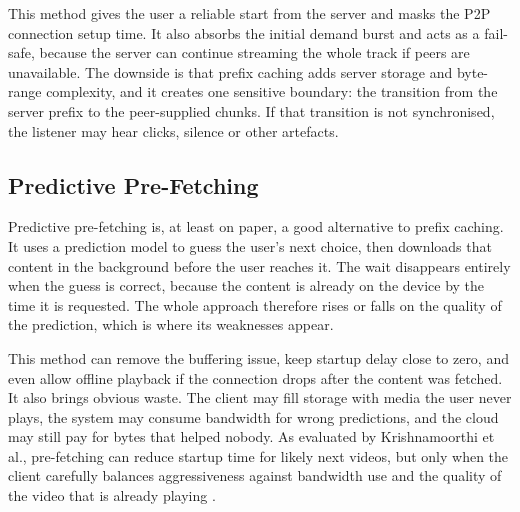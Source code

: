 \par This method gives the user a reliable start from the server and masks the P2P connection setup time. It also absorbs the initial demand burst and acts as a fail-safe, because the server can continue streaming the whole track if peers are unavailable. The downside is that prefix caching adds server storage and byte-range complexity, and it creates one sensitive boundary: the transition from the server prefix to the peer-supplied chunks. If that transition is not synchronised, the listener may hear clicks, silence or other artefacts.

\subsection{Predictive Pre-Fetching}
\indent \par Predictive pre-fetching is, at least on paper, a good alternative to prefix caching. It uses a prediction model to guess the user's next choice, then downloads that content in the background before the user reaches it. The wait disappears entirely when the guess is correct, because the content is already on the device by the time it is requested. The whole approach therefore rises or falls on the quality of the prediction, which is where its weaknesses appear.

\par This method can remove the buffering issue, keep startup delay close to zero, and even allow offline playback if the connection drops after the content was fetched. It also brings obvious waste. The client may fill storage with media the user never plays, the system may consume bandwidth for wrong predictions, and the cloud may still pay for bytes that helped nobody. As evaluated by Krishnamoorthi et al., pre-fetching can reduce startup time for likely next videos, but only when the client carefully balances aggressiveness against bandwidth use and the quality of the video that is already playing \cite{bandwidth_aware_prefetching}.



